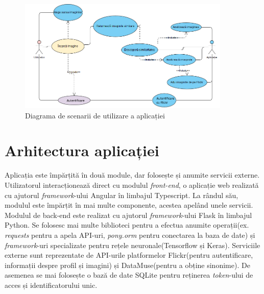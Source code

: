  \begin{figure}[!htbp]
    \begin{center}
        \includegraphics[width=0.9\textwidth]{images/use_case.png}
        \caption{Diagrama de scenarii de utilizare a aplicației}
    \end{center}
\end{figure}


\section{Arhitectura aplicației}
Aplicația este împărțită în două module, dar folosește și anumite servicii externe. Utilizatorul interacționează direct cu modulul  \textit{front-end}, o aplicație web realizată cu ajutorul \textit{framework}-ului Angular în limbajul Typescript. La rândul său, modulul este împărțit în mai multe componente, acestea apelând unele servicii. Modulul de back-end este realizat cu ajutorul \textit{framework}-ului Flask în limbajul Python. Se folosesc mai multe biblioteci pentru a efectua anumite operații(ex. \textit{requests} pentru a apela API-uri, \textit{pony.orm} pentru conectarea la baza de date) și \textit{framework}-uri specializate pentru rețele neuronale(Tensorflow și Keras). Serviciile externe sunt reprezentate de API-urile platformelor Flickr(pentru autentificare, informații despre profil și imagini) și DataMuse(pentru a obține sinonime). De asemenea se mai folosește o bază de date SQLite pentru reținerea \textit{token}-ului de acces și identificatorului unic.

